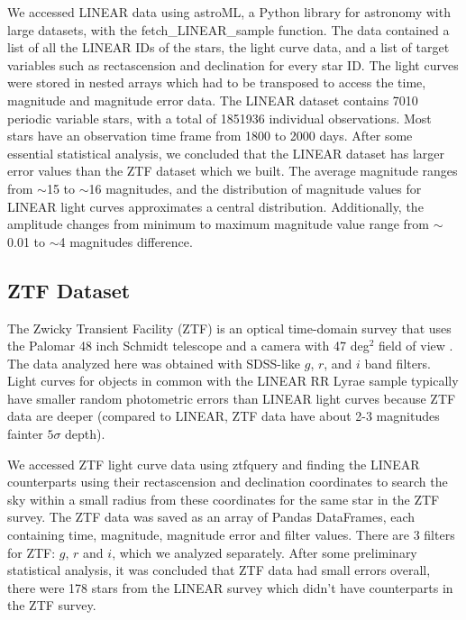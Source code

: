 We accessed LINEAR data using astroML, a Python library for astronomy with large datasets, with the fetch_LINEAR_sample function. 
The data contained a list of all the LINEAR IDs of the stars, the light curve data, and a list of target variables such as 
rectascension and declination for every star ID. The light curves were stored in nested arrays which had to be 
transposed to access the time, magnitude and magnitude error data. The LINEAR dataset contains 7010 periodic variable stars, with a total of 1851936 
individual observations. Most stars have an observation time frame from 1800 to 2000 days. After some essential statistical analysis, 
we concluded that the LINEAR dataset has larger error values than the ZTF dataset which we built. The average magnitude ranges from $\sim$15 to $\sim$16 magnitudes, 
and the distribution of magnitude values for LINEAR light curves approximates a central distribution. Additionally, the amplitude changes from minimum to maximum
magnitude value range from $\sim$0.01 to $\sim$4 magnitudes difference.

\subsection{ZTF Dataset}

The Zwicky Transient Facility (ZTF) is an optical time-domain survey that uses the Palomar 48 inch Schmidt telescope
and a camera with 47 deg$^2$ field of view \citep{2019PASP..131a8002B}. The data analyzed here was obtained with
SDSS-like $g$, $r$, and $i$ band filters. Light curves for objects in common with the LINEAR RR Lyrae sample typically
have smaller random photometric errors than LINEAR light curves because ZTF data are deeper (compared to LINEAR,
ZTF data have about 2-3 magnitudes fainter  $5\sigma$ depth).

We accessed ZTF light curve data using ztfquery and finding the LINEAR counterparts using their rectascension and declination coordinates to search the sky within a small radius from these coordinates
for the same star in the ZTF survey. The ZTF data was saved as an array of Pandas DataFrames, each containing time, magnitude, magnitude error and filter values. There are 3 filters for ZTF: $g$, $r$ and $i$,
which we analyzed separately. After some preliminary statistical analysis, it was concluded that ZTF data had small errors overall, there were 178 stars from the LINEAR survey which didn't have counterparts
in the ZTF survey. 




